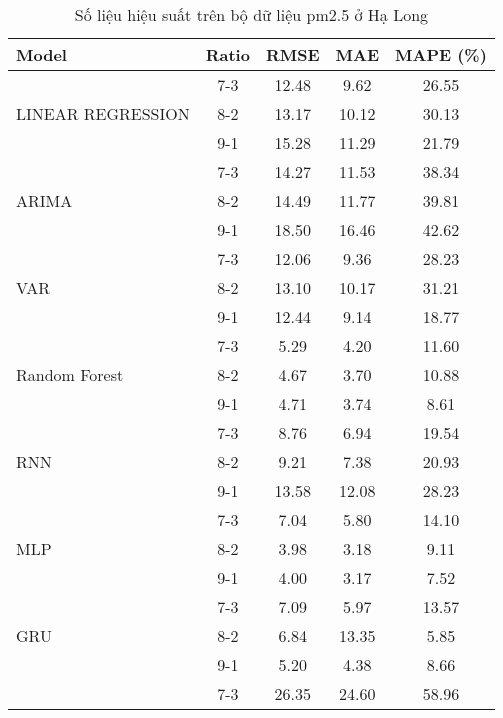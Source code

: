\begin{table}[h!]
    \centering
    \caption{Số liệu hiệu suất trên bộ dữ liệu pm2.5 ở Hạ Long}
    \begin{tabular}{|l|c|c|c|c|}
    \hline
    \rowcolor{orange!30} \textbf{Model} & \textbf{Ratio} & \textbf{RMSE} & \textbf{MAE} & \textbf{MAPE (\%)} \\ \hline
    \rowcolor{white}  & 7-3 & 12.48 & 9.62 & 26.55 \\ 
    \rowcolor{white}  LINEAR REGRESSION & 8-2 & 13.17 & 10.12 & 30.13 \\ 
    \rowcolor{white}  & 9-1 & 15.28 & 11.29 & 21.79 \\ \hline
    \rowcolor{white}  & 7-3 & 14.27 & 11.53 & 38.34 \\ 
    \rowcolor{white} ARIMA & 8-2 & 14.49 & 11.77 & 39.81 \\ 
    \rowcolor{white}  & 9-1 & 18.50 & 16.46 & 42.62 \\ \hline
    \rowcolor{white}  & 7-3 & 12.06 & 9.36 & 28.23 \\
    \rowcolor{white} VAR & 8-2 & 13.10 & 10.17 & 31.21 \\ 
    \rowcolor{white}  & 9-1 & 12.44 & 9.14 & 18.77 \\ \hline
    \rowcolor{white} & 7-3 & 5.29 & 4.20 & 11.60 \\ 
    \rowcolor{white} Random Forest & 8-2 & 4.67 & 3.70 & 10.88 \\ 
    \rowcolor{white} & 9-1 & 4.71 & 3.74 & 8.61 \\ \hline
    \rowcolor{white}  & 7-3 & 8.76 & 6.94 & 19.54 \\ 
    \rowcolor{white} RNN & 8-2 & 9.21 & 7.38 & 20.93 \\ 
    \rowcolor{white}  & 9-1 & 13.58 & 12.08 & 28.23 \\ \hline
    \rowcolor{white}  & 7-3 & 7.04 & 5.80 & 14.10 \\ 
    \rowcolor{white}MLP  & 8-2 & 3.98 & 3.18 & 9.11 \\ 
    \rowcolor{white}  & 9-1 & 4.00  & 3.17 & 7.52  \\ \hline
    \rowcolor{white}  & 7-3 & 7.09 & 5.97 & 13.57\\
    \rowcolor{white} GRU & 8-2 & 6.84 & 13.35 & 5.85  \\ 
    \rowcolor{white}  & 9-1 & 5.20 & 4.38 & 8.66 \\ \hline
    \rowcolor{white}  & 7-3 & 26.35 & 24.60 & 58.96 \\ 

\end{tabular}
\end{table}
